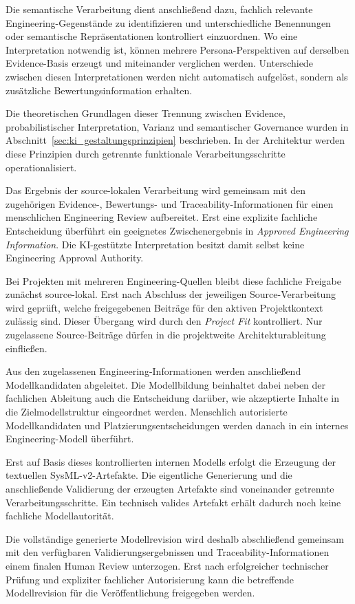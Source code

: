 Die semantische Verarbeitung dient anschließend dazu, fachlich relevante
Engineering-Gegenstände zu identifizieren und unterschiedliche Benennungen oder
semantische Repräsentationen kontrolliert einzuordnen. Wo eine Interpretation
notwendig ist, können mehrere Persona-Perspektiven auf derselben Evidence-Basis
erzeugt und miteinander verglichen werden. Unterschiede zwischen diesen
Interpretationen werden nicht automatisch aufgelöst, sondern als zusätzliche
Bewertungsinformation erhalten.

Die theoretischen Grundlagen dieser Trennung zwischen Evidence,
probabilistischer Interpretation, Varianz und semantischer Governance wurden in
Abschnitt~\ref{sec:ki_gestaltungsprinzipien} beschrieben. In der Architektur
werden diese Prinzipien durch getrennte funktionale Verarbeitungsschritte
operationalisiert.

Das Ergebnis der source-lokalen Verarbeitung wird gemeinsam mit den zugehörigen
Evidence-, Bewertungs- und Traceability-Informationen für einen menschlichen
Engineering Review aufbereitet. Erst eine explizite fachliche Entscheidung
überführt ein geeignetes Zwischenergebnis in
\emph{Approved Engineering Information}. Die KI-gestützte Interpretation
besitzt damit selbst keine Engineering Approval Authority.

Bei Projekten mit mehreren Engineering-Quellen bleibt diese fachliche Freigabe
zunächst source-lokal. Erst nach Abschluss der jeweiligen Source-Verarbeitung
wird geprüft, welche freigegebenen Beiträge für den aktiven Projektkontext
zulässig sind. Dieser Übergang wird durch den \emph{Project Fit} kontrolliert.
Nur zugelassene Source-Beiträge dürfen in die projektweite Architekturableitung
einfließen.

Aus den zugelassenen Engineering-Informationen werden anschließend
Modellkandidaten abgeleitet. Die Modellbildung beinhaltet dabei neben der
fachlichen Ableitung auch die Entscheidung darüber, wie akzeptierte Inhalte in
die Zielmodellstruktur eingeordnet werden. Menschlich autorisierte
Modellkandidaten und Platzierungsentscheidungen werden danach in ein internes
Engineering-Modell überführt.

Erst auf Basis dieses kontrollierten internen Modells erfolgt die Erzeugung der
textuellen SysML-v2-Artefakte. Die eigentliche Generierung und die anschließende
Validierung der erzeugten Artefakte sind voneinander getrennte
Verarbeitungsschritte. Ein technisch valides Artefakt erhält dadurch noch keine
fachliche Modellautorität.

Die vollständige generierte Modellrevision wird deshalb abschließend gemeinsam
mit den verfügbaren Validierungsergebnissen und Traceability-Informationen einem
finalen Human Review unterzogen. Erst nach erfolgreicher technischer Prüfung und
expliziter fachlicher Autorisierung kann die betreffende Modellrevision für die
Veröffentlichung freigegeben werden.

